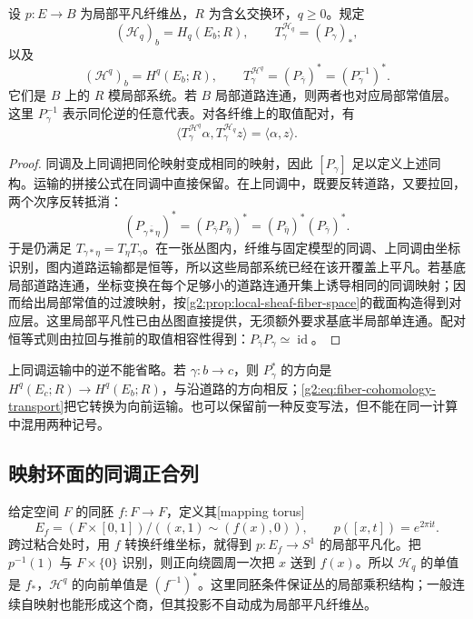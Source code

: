 \begin{corollary}\label{g2:cor:fiber-homology-systems}
	设 \(p:E\to B\) 为局部平凡纤维丛，\(R\) 为含幺交换环，\(q\geq0\)。规定
	\[
		(\mathcal H_q)_b=H_q(E_b;R),\qquad T^{\mathcal H_q}_\gamma=(P_\gamma)_*,
	\]
	以及
	\begin{equation}\label{g2:eq:fiber-cohomology-transport}
		(\mathcal H^q)_b=H^q(E_b;R),\qquad T^{\mathcal H^q}_\gamma=(P_{\bar\gamma})^*=(P_\gamma^{-1})^*.
	\end{equation}
	它们是 \(B\) 上的 \(R\) 模局部系统。若 \(B\) 局部道路连通，则两者也对应局部常值层。这里 \(P_\gamma^{-1}\) 表示同伦逆的任意代表。对各纤维上的取值配对，有
	\[
		\langle T^{\mathcal H^q}_\gamma\alpha,T^{\mathcal H_q}_\gamma z\rangle=\langle\alpha,z\rangle.
	\]
\end{corollary}
\begin{proof}
	同调及上同调把同伦映射变成相同的映射，因此 \([P_\gamma]\) 足以定义上述同构。运输的拼接公式在同调中直接保留。在上同调中，既要反转道路，又要拉回，两个次序反转抵消：
	\[
		(P_{\overline{\gamma*\eta}})^*=(P_{\bar\gamma}P_{\bar\eta})^*=(P_{\bar\eta})^*(P_{\bar\gamma})^*.
	\]
	于是仍满足 \(T_{\gamma*\eta}=T_\eta T_\gamma\)。在一张丛图内，纤维与固定模型的同调、上同调由坐标识别，图内道路运输都是恒等，所以这些局部系统已经在该开覆盖上平凡。若基底局部道路连通，坐标变换在每个足够小的道路连通开集上诱导相同的同调映射；因而给出局部常值的过渡映射，按\cref{g2:prop:local-sheaf-fiber-space}的截面构造得到对应层。这里局部平凡性已由丛图直接提供，无须额外要求基底半局部单连通。配对恒等式则由拉回与推前的取值相容性得到：\(P_{\bar\gamma}P_\gamma\simeq\operatorname{id}\)。
\end{proof}

上同调运输中的逆不能省略。若 \(\gamma:b\to c\)，则 \(P_\gamma^*\) 的方向是 \(H^q(E_c;R)\to H^q(E_b;R)\)，与沿道路的方向相反；\eqref{g2:eq:fiber-cohomology-transport}把它转换为向前运输。也可以保留前一种反变写法，但不能在同一计算中混用两种记号。

\subsection{映射环面的同调正合列}
\label{g2:subsec:0504:02}
给定空间 \(F\) 的同胚 \(f:F\to F\)，定义其[mapping torus]
\begin{equation}\label{g2:eq:mapping-torus-convention}
	E_f=(F\times[0,1])/((x,1)\sim(f(x),0)),\qquad p([x,t])=e^{2\pi\mathrm{i}t}.
\end{equation}
跨过粘合处时，用 \(f\) 转换纤维坐标，就得到 \(p:E_f\to S^1\) 的局部平凡化。把 \(p^{-1}(1)\) 与 \(F\times\{0\}\) 识别，则正向绕圆周一次把 \(x\) 送到 \(f(x)\)。所以 \(\mathcal H_q\) 的单值是 \(f_*\)，\(\mathcal H^q\) 的向前单值是 \((f^{-1})^*\)。这里同胚条件保证丛的局部乘积结构；一般连续自映射也能形成这个商，但其投影不自动成为局部平凡纤维丛。

